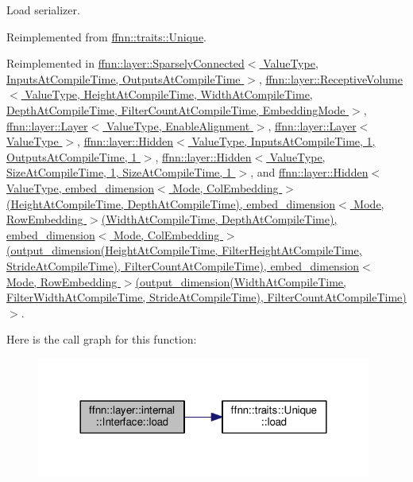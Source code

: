 Load serializer. 



Reimplemented from \hyperlink{classffnn_1_1traits_1_1_unique_af1e937c2908ed2ff707d6a7d1b5b13d2}{ffnn\-::traits\-::\-Unique}.



Reimplemented in \hyperlink{classffnn_1_1layer_1_1_sparsely_connected_a0996cd78dc2f76cab36fac2ec5c8f323}{ffnn\-::layer\-::\-Sparsely\-Connected$<$ Value\-Type, Inputs\-At\-Compile\-Time, Outputs\-At\-Compile\-Time $>$}, \hyperlink{classffnn_1_1layer_1_1_receptive_volume_aebfd8f149057b061d6880669376175e3}{ffnn\-::layer\-::\-Receptive\-Volume$<$ Value\-Type, Height\-At\-Compile\-Time, Width\-At\-Compile\-Time, Depth\-At\-Compile\-Time, Filter\-Count\-At\-Compile\-Time, Embedding\-Mode $>$}, \hyperlink{classffnn_1_1layer_1_1_layer_a66c56645e54f6e864fb716fdc8858828}{ffnn\-::layer\-::\-Layer$<$ Value\-Type, Enable\-Alignment $>$}, \hyperlink{classffnn_1_1layer_1_1_layer_a66c56645e54f6e864fb716fdc8858828}{ffnn\-::layer\-::\-Layer$<$ Value\-Type $>$}, \hyperlink{classffnn_1_1layer_1_1_hidden_a696f61b2d9b661b7a8d6bdb3dc32b536}{ffnn\-::layer\-::\-Hidden$<$ Value\-Type, Inputs\-At\-Compile\-Time, 1, Outputs\-At\-Compile\-Time, 1 $>$}, \hyperlink{classffnn_1_1layer_1_1_hidden_a696f61b2d9b661b7a8d6bdb3dc32b536}{ffnn\-::layer\-::\-Hidden$<$ Value\-Type, Size\-At\-Compile\-Time, 1, Size\-At\-Compile\-Time, 1 $>$}, and \hyperlink{classffnn_1_1layer_1_1_hidden_a696f61b2d9b661b7a8d6bdb3dc32b536}{ffnn\-::layer\-::\-Hidden$<$ Value\-Type, embed\-\_\-dimension$<$ Mode, Col\-Embedding $>$(\-Height\-At\-Compile\-Time, Depth\-At\-Compile\-Time), embed\-\_\-dimension$<$ Mode, Row\-Embedding $>$(\-Width\-At\-Compile\-Time, Depth\-At\-Compile\-Time), embed\-\_\-dimension$<$ Mode, Col\-Embedding $>$(output\-\_\-dimension(\-Height\-At\-Compile\-Time, Filter\-Height\-At\-Compile\-Time, Stride\-At\-Compile\-Time), Filter\-Count\-At\-Compile\-Time), embed\-\_\-dimension$<$ Mode, Row\-Embedding $>$(output\-\_\-dimension(\-Width\-At\-Compile\-Time, Filter\-Width\-At\-Compile\-Time, Stride\-At\-Compile\-Time), Filter\-Count\-At\-Compile\-Time)$>$}.



Here is the call graph for this function\-:\nopagebreak
\begin{figure}[H]
\begin{center}
\leavevmode
\includegraphics[width=312pt]{classffnn_1_1layer_1_1internal_1_1_interface_a88b5bd86aafd361d3a84dc6cba211195_cgraph}
\end{center}
\end{figure}


